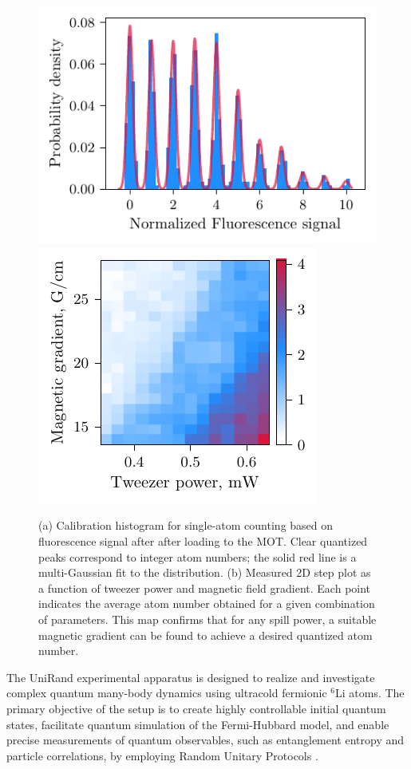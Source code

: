 \begin{figure}
    \centering
    \includegraphics{fig-py/atom-counting.pdf}
    \phantom{4242}
    \includegraphics{fig-py/step-plot-2d.pdf}
    \caption{
        (a) Calibration histogram for single-atom counting based on fluorescence signal after after loading to the MOT. Clear quantized peaks correspond to integer atom numbers; the solid red line is a multi-Gaussian fit to the distribution. 
        (b) Measured 2D step plot as a function of tweezer power and magnetic field gradient. Each point indicates the average atom number obtained for a given combination of parameters. This map confirms that for any spill power, a suitable magnetic gradient can be found to achieve a desired quantized atom number.
    }
    \label{fig:spillingadd}
\end{figure}


The UniRand experimental apparatus is designed to realize and investigate complex quantum many-body dynamics using ultracold fermionic $^6$Li atoms. The primary objective of the setup is to create highly controllable initial quantum states, facilitate quantum simulation of the Fermi-Hubbard model, and enable precise measurements of quantum observables, such as entanglement entropy and particle correlations, by employing Random Unitary Protocols \cite{culemann_construction_2024, huang_construction_2024}.

